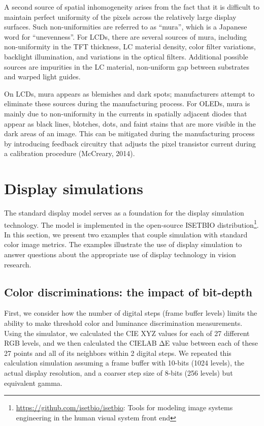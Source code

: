 \documentclass[
  letterpaper,
]{book}
\begin{document}
A second source of spatial inhomogeneity arises from the fact that it is
difficult to maintain perfect uniformity of the pixels across the
relatively large display surfaces. Such non-uniformities are referred to
as ``mura'', which is a Japanese word for ``unevenness''. For LCDs,
there are several sources of mura, including non-uniformity in the TFT
thickness, LC material density, color filter variations, backlight
illumination, and variations in the optical filters. Additional possible
sources are impurities in the LC material, non-uniform gap between
substrates and warped light guides.

On LCDs, mura appears as blemishes and dark spots; manufacturers attempt
to eliminate these sources during the manufacturing process. For OLEDs,
mura is mainly due to non-uniformity in the currents in spatially
adjacent diodes that appear as black lines, blotches, dots, and faint
stains that are more visible in the dark areas of an image. This can be
mitigated during the manufacturing process by introducing feedback
circuitry that adjusts the pixel transistor current during a calibration
procedure (McCreary, 2014).

\section{Display simulations}\label{display-simulations}

The standard display model serves as a foundation for the display
simulation technology. The model is implemented in the open-source
ISETBIO distribution\footnote{\url{https://github.com/isetbio/isetbio}:
  Tools for modeling image systems engineering in the human visual
  system front end}. In this section, we present two examples that
couple simulation with standard color image metrics. The examples
illustrate the use of display simulation to answer questions about the
appropriate use of display technology in vision research.

\subsection{Color discriminations: the impact of
bit-depth}\label{color-discriminations-the-impact-of-bit-depth}

First, we consider how the number of digital steps (frame buffer levels)
limits the ability to make threshold color and luminance discrimination
measurements. Using the simulator, we calculated the CIE XYZ values for
each of 27 different RGB levels, and we then calculated the CIELAB ΔE
value between each of these 27 points and all of its neighbors within 2
digital steps. We repeated this calculation simulation assuming a frame
buffer with 10-bits (1024 levels), the actual display resolution, and a
coarser step size of 8-bits (256 levels) but equivalent gamma.
\end{document}
